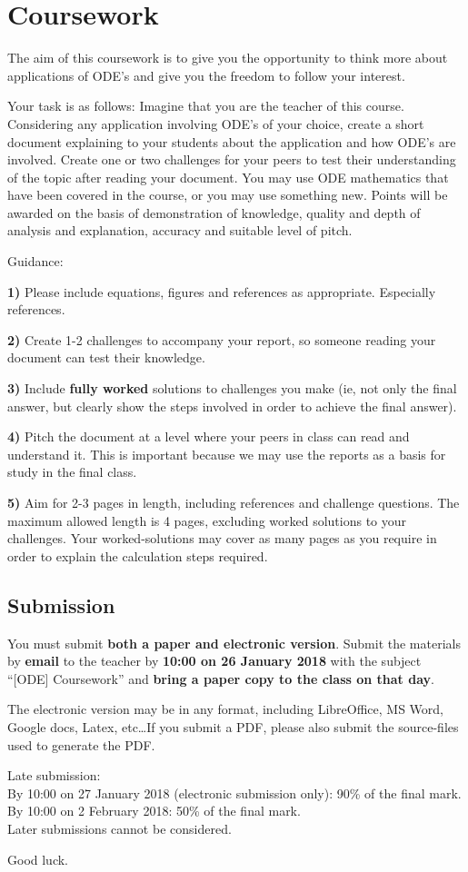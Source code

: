 \newpage
\section{Coursework}
The aim of this coursework is to give you the opportunity to think more about applications of ODE's and give you the freedom to follow your interest.

Your task is as follows:
Imagine that you are the teacher of this course.
Considering any application involving ODE's of your choice, create a short document explaining to your students about the application and how ODE's are involved.
Create one or two challenges for your peers to test their understanding of the topic after reading your document.
You may use ODE mathematics that have been covered in the course, or you may use something new.
Points will be awarded on the basis of demonstration of knowledge, quality and depth of analysis and explanation, accuracy and suitable level of pitch.

Guidance:

\textbf{1)} Please include equations, figures and references as appropriate. Especially references.

\textbf{2)} Create 1-2 challenges to accompany your report, so someone reading your document can test their knowledge.

\textbf{3)} Include \textbf{fully worked} solutions to challenges you make (ie, not only the final answer, but clearly show the steps involved in order to achieve the final answer).

\textbf{4)} Pitch the document at a level where your peers in class can read and understand it. This is important because we may use the reports as a basis for study in the final class.

\textbf{5)} Aim for 2-3 pages in length, including references and challenge questions. The maximum allowed length is 4 pages, excluding worked solutions to your challenges. Your worked-solutions may cover as many pages as you require in order to explain the calculation steps required.

\subsection{Submission}
You must submit \textbf{both a paper and electronic version}. Submit the materials by \textbf{email} to the teacher by \textbf{10:00 on 26 January 2018} with the subject ``[ODE] Coursework'' and \textbf{bring a paper copy to the class on that day}.

The electronic version may be in any format, including LibreOffice, MS Word, Google docs, Latex, etc\ldots If you submit a PDF, please also submit the source-files used to generate the PDF.

Late submission:\\
By 10:00 on 27 January 2018 (electronic submission only): 90\% of the final mark.\\
By 10:00 on 2 February 2018: 50\% of the final mark.\\
Later submissions cannot be considered.

Good luck.
